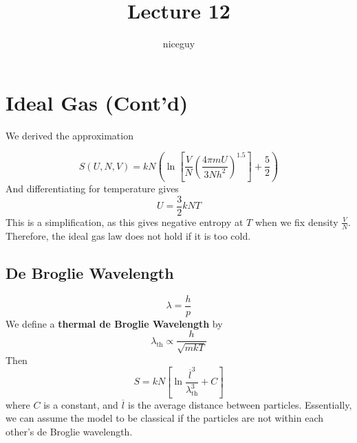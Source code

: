 \documentclass[12pt]{article}
\author{niceguy}
\title{Lecture 12}
\begin{document}
\maketitle

\section{Ideal Gas (Cont'd)}

We derived the approximation

$$S(U,N,V) = kN\left(\ln\left[\frac{V}{N}\left(\frac{4\pi mU}{3Nh^2}\right)^{1.5}\right]+\frac{5}{2}\right)$$
And differentiating for temperature gives
$$U = \frac{3}{2} kNT$$
This is a simplification, as this gives negative entropy at $T$ when we fix density $\frac{V}{N}$. Therefore, the ideal gas law does not hold if it is too cold.

\subsection{De Broglie Wavelength}

$$\lambda = \frac{h}{p}$$
We define a \textbf{thermal de Broglie Wavelength} by
$$\lambda_{\text{th}} \propto \frac{h}{\sqrt{mkT}}$$
Then
$$S = kN\left[\ln\frac{\overline{l}^3}{\lambda_{\text{th}}^3}+C\right]$$
where $C$ is a constant, and $\overline{l}$ is the average distance between particles. Essentially, we can assume the model to be classical if the particles are not within each other's de Broglie wavelength.
\end{document}

